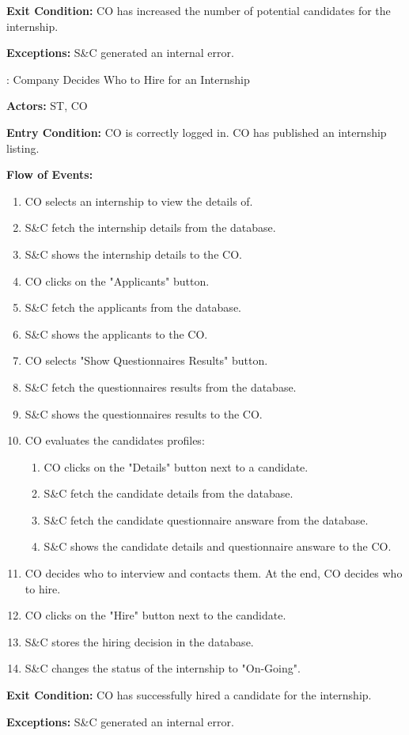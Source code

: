 \par \textbf{Exit Condition:} CO has increased the number of potential candidates for the internship.

\par \textbf{Exceptions:}  S\&C generated an internal error.

\nextUseCaseID: Company Decides Who to Hire for an Internship

\par \textbf{Actors:} ST, CO

\par \textbf{Entry Condition:} CO is correctly logged in. CO has published an internship listing.

\par \textbf{Flow of Events:}

\begin{enumerate}
    \item CO selects an internship to view the details of.
    \item S\&C fetch the internship details from the database.
    \item S\&C shows the internship details to the CO.
    \item CO clicks on the "Applicants" button.
    \item S\&C fetch the applicants from the database.
    \item S\&C shows the applicants to the CO.
    \item CO selects "Show Questionnaires Results" button.
    \item S\&C fetch the questionnaires results from the database.
    \item S\&C shows the questionnaires results to the CO.
    \item CO evaluates the candidates profiles:
    \begin{enumerate}
        \item CO clicks on the "Details" button next to a candidate.
        \item S\&C fetch the candidate details from the database.
        \item S\&C fetch the candidate questionnaire answare from the database.
        \item S\&C shows the candidate details and questionnaire answare to the CO.
    \end{enumerate}
    \item CO decides who to interview and contacts them. At the end, CO decides who to hire.
    \item CO clicks on the "Hire" button next to the candidate.
    \item S\&C stores the hiring decision in the database.
    \item S\&C changes the status of the internship to "On-Going".
\end{enumerate}

\par \textbf{Exit Condition:} CO has successfully hired a candidate for the internship.

\par \textbf{Exceptions:}  S\&C generated an internal error.